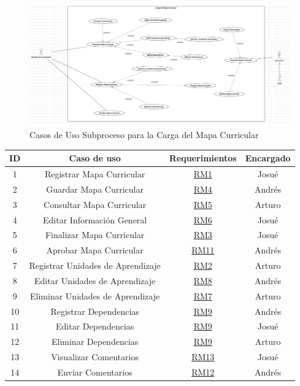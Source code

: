 \begin{figure}[htbp]
	\begin{center}
		\includegraphics[width=.95\textwidth]{C2-DR/SP4/Image/CasosDeUso}
		\caption{Casos de Uso Subproceso para la  Carga del Mapa Curricular}
		\label{CU-SP4}
	\end{center}
\end{figure}

\begin{center}
	\begin{tabular}{|c|c|c|c|}
		\hline
		ID & Caso de uso & Requerimientos & Encargado \\ \hline
        1 & Registrar Mapa Curricular & \hyperref[RM1]{RM1} & Josué \\ \hline
        2 & Guardar Mapa Curricular & \hyperref[RM4]{RM4} & Andrés \\ \hline
        3 & Consultar Mapa Curricular & \hyperref[RM5]{RM5} & Arturo \\ \hline
		4 & Editar Información General & \hyperref[RM6]{RM6} & Josué \\ \hline
        5 & Finalizar Mapa Curricular & \hyperref[RM3]{RM3} & Josué \\ \hline
        6 & Aprobar Mapa Curricular & \hyperref[RM11]{RM11} & Andrés \\ \hline
        7 & Registrar Unidades de Aprendizaje & \hyperref[RM2]{RM2} & Arturo \\ \hline
        8 & Editar Unidades de Aprendizaje & \hyperref[RM8]{RM8} & Andrés \\ \hline
        9 & Eliminar Unidades de Aprendizaje & \hyperref[RM7]{RM7} & Arturo \\ \hline
        10 & Registrar Dependencias & \hyperref[RM9]{RM9} & Andrés \\ \hline
        11 & Editar Dependencias & \hyperref[RM9]{RM9} & Josué \\ \hline
        12 & Eliminar Dependencias & \hyperref[RM9]{RM9} & Arturo \\ \hline
        13 & Visualizar Comentarios & \hyperref[RM13]{RM13} & Josué \\ \hline
        14 & Enviar Comentarios & \hyperref[RM12]{RM12} & Andrés \\ \hline
    \end{tabular}
\end{center}

